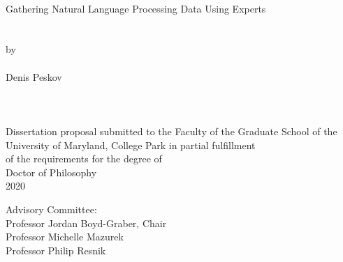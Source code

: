 
\thispagestyle{empty}
\hbox{\ }
\vspace{1in}
\renewcommand{\baselinestretch}{1}
\small\normalsize
\begin{center}

    \large{{Gathering Natural Language Processing Data Using Experts}}   \\
    \ \\
    \ \\
    \large{by} \\
    \ \\
    \large{Denis Peskov}%
    \ \\
    \ \\
    \ \\
    \ \\
    \normalsize
    Dissertation proposal submitted to the Faculty of the Graduate School of the \\
    University of Maryland, College Park in partial fulfillment \\
    of the requirements for the degree of \\
    Doctor of Philosophy \\
    2020
\end{center}

\vspace{7.5em}

\noindent Advisory Committee: \\
Professor Jordan Boyd-Graber, Chair \\
Professor Michelle Mazurek \\
Professor Philip Resnik \\
